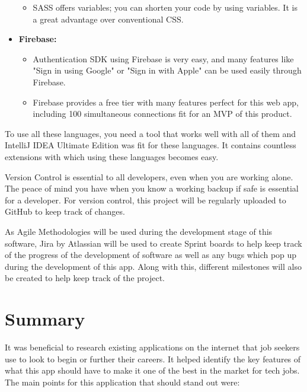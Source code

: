 \begin{itemize}
\begin{itemize}
        \item SASS offers variables; you can shorten your code by using variables. It is a great advantage over conventional CSS.
    \end{itemize}
    \item \textbf{Firebase:} \parencite{Reference24}
    \begin{itemize}
        \item Authentication SDK using Firebase is very easy, and many features like "Sign in using Google" or "Sign in with Apple" can be used easily through Firebase.
        \item Firebase provides a free tier with many features perfect for this web app, including 100 simultaneous connections fit for an MVP of this product.
    \end{itemize}
\end{itemize}

To use all these languages, you need a tool that works well with all of them and IntelliJ IDEA Ultimate Edition \parencite{Reference23} was fit for these languages. It contains countless extensions with which using these languages becomes easy. 

Version Control is essential to all developers, even when you are working alone. The peace of mind you have when you know a working backup if safe is essential for a developer. For version control, this project will be regularly uploaded to GitHub to keep track of changes.

As Agile Methodologies will be used during the development stage of this software, Jira by Atlassian \parencite{Reference27} will be used to create Sprint boards to help keep track of the progress of the development of software as well as any bugs which pop up during the development of this app. Along with this, different milestones will also be created to help keep track of the project. 

\section{Summary}
It was beneficial to research existing applications on the internet that job seekers use to look to begin or further their careers. It helped identify the key features of what this app should have to make it one of the best in the market for tech jobs. The main points for this application that should stand out were:

